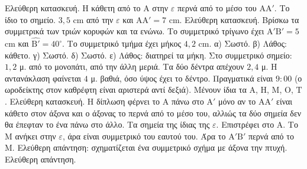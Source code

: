  Ελεύθερη κατασκευή. Η κάθετη από το $\mathrm{Α}$ στην $\varepsilon$ περνά από το μέσο του $\mathrm{ΑΑ}'$.
 Το ίδιο το σημείο.
 $3{,}5$ cm από την $\varepsilon$ και $\mathrm{ΑΑ}'=7$ cm.
 Ελεύθερη κατασκευή. Βρίσκω τα συμμετρικά των τριών κορυφών και τα ενώνω.
 Το συμμετρικό τρίγωνο έχει $\mathrm{Α}'\mathrm{Β}'=5$ cm και $\widehat{\mathrm{Β}'}=40^\circ$.
 Το συμμετρικό τμήμα έχει μήκος $4{,}2$ cm.
 α) Σωστό. β) Λάθος: κάθετο. γ) Σωστό. δ) Σωστό. ε) Λάθος: διατηρεί τα μήκη.
 Στο συμμετρικό σημείο: $1{,}2$ μ. από το μονοπάτι, από την άλλη μεριά. Τα δύο δέντρα απέχουν $2{,}4$ μ.
 Η αντανάκλαση φαίνεται $4$ μ. βαθιά, όσο ύψος έχει το δέντρο.
 Πραγματικά είναι $9{:}00$ (ο ωροδείκτης στον καθρέφτη είναι αριστερά αντί δεξιά).
 Μένουν ίδια τα $\mathrm{Α}$, $\mathrm{Η}$, $\mathrm{Μ}$, $\mathrm{Ο}$, $\mathrm{Τ}$.
 Ελεύθερη κατασκευή.
 Η δίπλωση φέρνει το $\mathrm{Α}$ πάνω στο $\mathrm{Α}'$ μόνο αν το $\mathrm{ΑΑ}'$ είναι κάθετο στον άξονα και ο άξονας το περνά από το μέσο του, αλλιώς τα δύο σημεία δεν θα έπεφταν το ένα πάνω στο άλλο.
 Τα σημεία της ίδιας της $\varepsilon$.
 Επιστρέφει στο $\mathrm{Α}$.
 Το $\mathrm{Μ}$ ανήκει στην $\varepsilon$, άρα είναι συμμετρικό του εαυτού του. Άρα το $\mathrm{Α}'\mathrm{Β}'$ περνά από το $\mathrm{Μ}$.
 Ελεύθερη απάντηση: σχηματίζεται ένα συμμετρικό σχήμα με άξονα την πτυχή.
 Ελεύθερη απάντηση.
